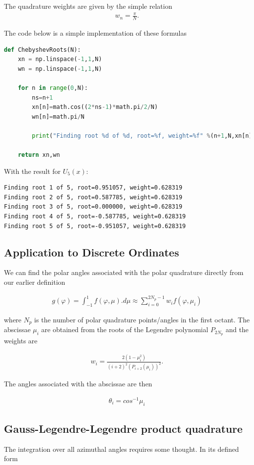 \documentclass[11pt,letterpaper,titlepage]{article}
\newcommand{\beq}{\begin{equation*}
\begin{aligned}}
\newcommand{\eeq}{\end{aligned}
\end{equation*}}
\newcommand{\beqn}{\begin{equation}
	\begin{aligned}}
\newcommand{\eeqn}{\end{aligned}
	\end{equation}}
\numberwithin{equation}{section}
\begin{document}
\begin{appendices}
The quadrature weights are given by the simple relation
\beqn
w_n = \frac{\pi}{N}.
\eeqn

The code below is a simple implementation of these formulas

\begin{lstlisting}[language=python]
def ChebyshevRoots(N):
    xn = np.linspace(-1,1,N)
    wn = np.linspace(-1,1,N)
    
    for n in range(0,N):
        ns=n+1
        xn[n]=math.cos((2*ns-1)*math.pi/2/N)
        wn[n]=math.pi/N
        
        print("Finding root %d of %d, root=%f, weight=%f" %(n+1,N,xn[n],wn[n]))
        
    return xn,wn
\end{lstlisting}
With the result for $U_5(x)$:
\begin{verbatim}
Finding root 1 of 5, root=0.951057, weight=0.628319
Finding root 2 of 5, root=0.587785, weight=0.628319
Finding root 3 of 5, root=0.000000, weight=0.628319
Finding root 4 of 5, root=-0.587785, weight=0.628319
Finding root 5 of 5, root=-0.951057, weight=0.628319
\end{verbatim}

\newpage
\subsection{Application to Discrete Ordinates}
We can find the polar angles associated with the polar quadrature directly from our earlier definition

\beq
g(\varphi) = \int_{-1}^1  f(\varphi,\mu).d\mu \approx \sum_{i=0}^{2N_p-1} w_i f(\varphi,\mu_i)
\eeq

where $N_p$ is the number of polar quadrature points/angles in the first octant. The abscissae $\mu_i$ are obtained from the roots of the Legendre polynomial $P_{2N_p}$ and the weights are 

\beqn
w_i = \frac{2(1-\mu_i^2)}{(i+2)^2  (P_{i+2}(\mu_i))^2}.
\eeqn

The angles associated with the abscissae are then 

\beqn
\theta_i = cos^{-1}\mu_i
\eeqn

\subsection{Gauss-Legendre-Legendre product quadrature}

The integration over all azimuthal angles requires some thought. In its defined form


\end{appendices}
\end{document}

